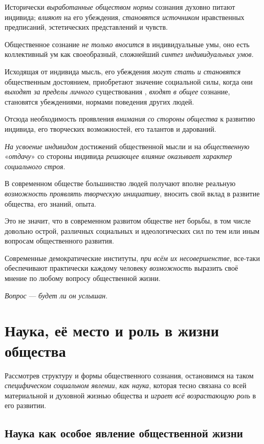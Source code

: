 \documentclass[a4paper,14pt,russian]{extreport}
\begin{document}
Исторически \emph{выработанные обществом нормы} сознания духовно питают индивида; \emph{влияют} на его убеждения, \emph{становятся источником} нравственных предписаний, эстетических представлений и чувств.

Общественное сознание \emph{не только вносится} в индивидуальные умы, оно есть коллективный ум как своеобразный, сложнейший \emph{синтез индивидуальных умов}.

Исходящая от индивида мысль, его убеждения \emph{могут стать и становятся} общественным достоянием, приобретают значение социальной силы, когда они \emph{выходят за пределы личного} существования , \emph{входят в общее} сознание, становятся убеждениями, нормами поведения других людей.

Отсюда необходимость проявления \emph{внимания со стороны общества} к развитию индивида, его творческих возможностей, его талантов и дарований.

\emph{На усвоение индивидом} достижений общественной мысли и на \emph{общественную} «\emph{отдачу}» со стороны индивида \emph{решающее влияние оказывает характер социального строя}.

В современном обществе большинство людей получают вполне реальную \emph{возможность проявлять творческую инициативу}, вносить свой вклад в развитие общества, его знаний, опыта.

Это не значит, что в современном развитом обществе нет борьбы, в том числе довольно острой, различных социальных и идеологических сил по тем или иным вопросам общественного развития.

Современные демократические институты, \emph{при всём их несовершенстве}, все-таки обеспечивают практически каждому человеку \emph{возможность} выразить своё мнение по любому вопросу общественной жизни.

\emph{Вопрос} --- \emph{будет ли он услышан}.

\section{Наука, её место и роль в жизни общества}

Рассмотрев структуру и формы общественного сознания, остановимся на таком \emph{специфическом социальном явлении}, \emph{как наука}, которая тесно связана со всей материальной и духовной жизнью общества и \emph{играет всё возрастающую роль} в его развитии.

\subsection{Наука как особое явление общественной жизни}
\end{document}
